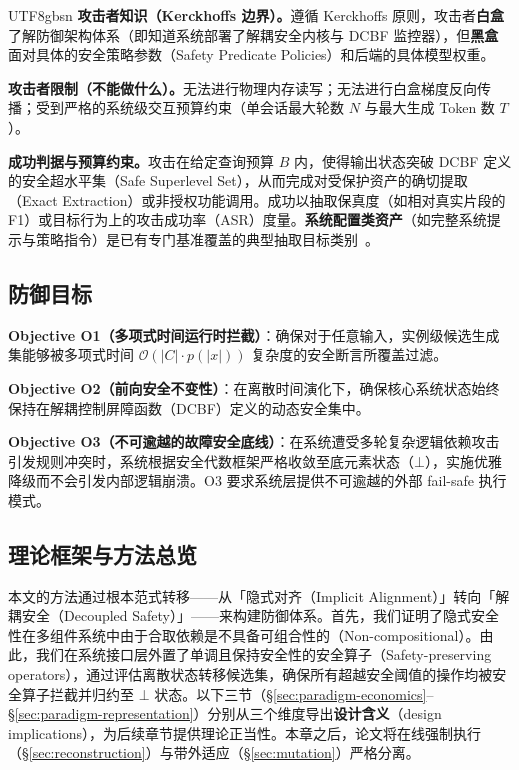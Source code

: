 \documentclass[letterpaper,twocolumn,10pt]{article}
\begin{document}
\begin{CJK}{UTF8}{gbsn}
\textbf{攻击者知识（Kerckhoffs 边界）。}遵循 Kerckhoffs 原则，攻击者\textbf{白盒}了解防御架构体系（即知道系统部署了解耦安全内核与 DCBF 监控器），但\textbf{黑盒}面对具体的安全策略参数（Safety Predicate Policies）和后端的具体模型权重。

\textbf{攻击者限制（不能做什么）。}无法进行物理内存读写；无法进行白盒梯度反向传播；受到严格的系统级交互预算约束（单会话最大轮数 $N$ 与最大生成 Token 数 $T$）。

\textbf{成功判据与预算约束。}攻击在给定查询预算 $B$ 内，使得输出状态突破 DCBF 定义的安全超水平集（Safe Superlevel Set），从而完成对受保护资产的确切提取（Exact Extraction）或非授权功能调用。成功以抽取保真度（如相对真实片段的 F1）或目标行为上的攻击成功率（ASR）度量。\textbf{系统配置类资产}（如完整系统提示与策略指令）是已有专门基准覆盖的典型抽取目标类别~\cite{spe-llm}。

\subsection{防御目标}
\label{sec:defense-goals}

\noindent \textbf{Objective O1（多项式时间运行时拦截）}：确保对于任意输入，实例级候选生成集能够被多项式时间 $\mathcal{O}(|C| \cdot p(|x|))$ 复杂度的安全断言所覆盖过滤。

\noindent \textbf{Objective O2（前向安全不变性）}：在离散时间演化下，确保核心系统状态始终保持在解耦控制屏障函数（DCBF）定义的动态安全集中。

\noindent \textbf{Objective O3（不可逾越的故障安全底线）}：在系统遭受多轮复杂逻辑依赖攻击引发规则冲突时，系统根据安全代数框架严格收敛至底元素状态（$\bot$），实施优雅降级而不会引发内部逻辑崩溃。O3 要求系统层提供不可逾越的外部 fail-safe 执行模式。

\subsection{理论框架与方法总览}
\label{sec:paradigm-overview}

本文的方法通过根本范式转移——从「隐式对齐（Implicit Alignment）」转向「解耦安全（Decoupled Safety）」——来构建防御体系。首先，我们证明了隐式安全性在多组件系统中由于合取依赖是不具备可组合性的（Non-compositional）。由此，我们在系统接口层外置了单调且保持安全性的安全算子（Safety-preserving operators），通过评估离散状态转移候选集，确保所有超越安全阈值的操作均被安全算子拦截并归约至 $\bot$ 状态。以下三节（\S\ref{sec:paradigm-economics}--\S\ref{sec:paradigm-representation}）分别从三个维度导出\textbf{设计含义}（design implications），为后续章节提供理论正当性。本章之后，论文将在线强制执行（\S\ref{sec:reconstruction}）与带外适应（\S\ref{sec:mutation}）严格分离。


\end{CJK}
\end{document}

